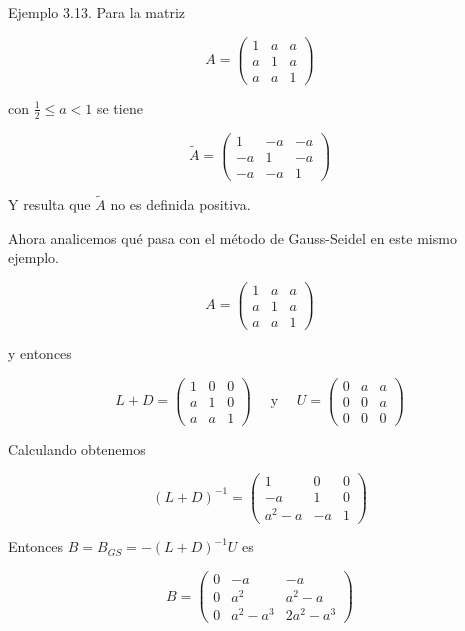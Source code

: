 \documentclass[10pt]{book}
\begin{document}
Ejemplo 3.13. Para la matriz

$$
A=\left(\begin{array}{lll}
1 & a & a \\
a & 1 & a \\
a & a & 1
\end{array}\right)
$$

con $\frac{1}{2} \leq a<1$ se tiene

$$
\tilde{A}=\left(\begin{array}{ccc}
1 & -a & -a \\
-a & 1 & -a \\
-a & -a & 1
\end{array}\right)
$$

Y resulta que $\tilde{A}$ no es definida positiva.

Ahora analicemos qué pasa con el método de Gauss-Seidel en este mismo ejemplo.

$$
A=\left(\begin{array}{lll}
1 & a & a \\
a & 1 & a \\
a & a & 1
\end{array}\right)
$$

y entonces

$$
L+D=\left(\begin{array}{ccc}
1 & 0 & 0 \\
a & 1 & 0 \\
a & a & 1
\end{array}\right) \quad \text { y } \quad U=\left(\begin{array}{ccc}
0 & a & a \\
0 & 0 & a \\
0 & 0 & 0
\end{array}\right)
$$

Calculando obtenemos

$$
(L+D)^{-1}=\left(\begin{array}{ccc}
1 & 0 & 0 \\
-a & 1 & 0 \\
a^{2}-a & -a & 1
\end{array}\right)
$$

Entonces $B=B_{G S}=-(L+D)^{-1} U$ es

$$
B=\left(\begin{array}{ccc}
0 & -a & -a \\
0 & a^{2} & a^{2}-a \\
0 & a^{2}-a^{3} & 2 a^{2}-a^{3}
\end{array}\right)
$$
\end{document}
